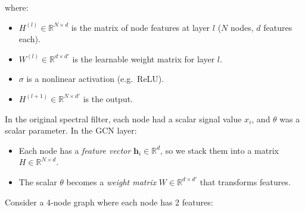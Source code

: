 \begin{notechapter}
where:
\begin{itemize}
    \item $H^{(l)} \in \mathbb{R}^{N \times d}$ is the matrix of node
          features at layer $l$ ($N$ nodes, $d$ features each).
    \item $W^{(l)} \in \mathbb{R}^{d \times d'}$ is the learnable weight
          matrix for layer $l$.
    \item $\sigma$ is a nonlinear activation (e.g.\ ReLU).
    \item $H^{(l+1)} \in \mathbb{R}^{N \times d'}$ is the output.
\end{itemize}

\begin{remark}
In the original spectral filter, each node had a scalar signal value
$x_i$, and $\theta$ was a scalar parameter. In the GCN layer:
\begin{itemize}
    \item Each node has a \emph{feature vector} $\mathbf{h}_i \in \mathbb{R}^d$,
          so we stack them into a matrix $H \in \mathbb{R}^{N \times d}$.
    \item The scalar $\theta$ becomes a \emph{weight matrix}
          $W \in \mathbb{R}^{d \times d'}$ that transforms features.
\end{itemize}
\end{remark}

\begin{example}
Consider a 4-node graph where each node has 2 features:

\begin{center}
\end{center}


\end{example}
\end{notechapter}
